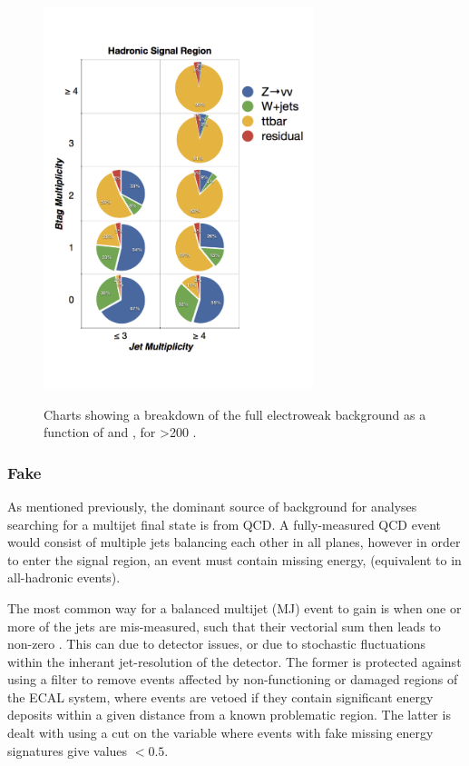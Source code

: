 \begin{figure}[hb!]
\centering
\hspace{1.8cm}\includegraphics[width=0.7\textwidth]{Figs/ra1_had_bg_comp.pdf}
\label{fig:background_decomp}
\caption{Charts showing a breakdown of the full electroweak background as a 
function of \nj and \nb, for \HT>200 \gev.}
\end{figure}

\subsubsection{Fake \met}

As mentioned previously, the dominant source of background for analyses 
searching for a multijet final state is from QCD. A fully-measured QCD event 
would consist of multiple jets balancing each other in all planes, however in 
order to enter the signal region, an event must contain missing energy, 
\mht (equivalent to \met in all-hadronic events).

The most common way for a balanced multijet (MJ) event to gain \mht is when one 
or more of the jets are mis-measured, such that their vectorial sum then leads to non-zero
\mht. This can due to detector issues, or due to stochastic fluctuations within
the inherant jet-resolution of the 
detector. The former is protected against using a filter to remove events 
affected by non-functioning or damaged regions of the ECAL system, where 
events are vetoed if they contain significant energy deposits within a given 
distance from a known problematic region. The latter is dealt with using a
cut on the \alphat variable where 
events with fake missing energy signatures give values $<0.5$.

